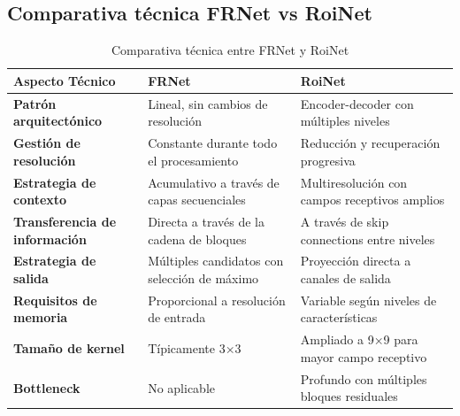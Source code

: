 \documentclass[11pt,a4paper]{report} %
\begin{document}
\subsection{Comparativa técnica FRNet vs RoiNet}
\begin{table}[htbp]
\centering
\caption{Comparativa técnica entre FRNet y RoiNet}
\begin{tabular}{|l|l|l|}
\hline
\textbf{Aspecto Técnico} & \textbf{FRNet} & \textbf{RoiNet} \\
\hline
\textbf{Patrón arquitectónico} & Lineal, sin cambios de resolución & Encoder-decoder con múltiples niveles \\
\hline
\textbf{Gestión de resolución} & Constante durante todo el procesamiento & Reducción y recuperación progresiva \\
\hline
\textbf{Estrategia de contexto} & Acumulativo a través de capas secuenciales & Multiresolución con campos receptivos amplios \\
\hline
\textbf{Transferencia de información} & Directa a través de la cadena de bloques & A través de skip connections entre niveles \\
\hline
\textbf{Estrategia de salida} & Múltiples candidatos con selección de máximo & Proyección directa a canales de salida \\
\hline
\textbf{Requisitos de memoria} & Proporcional a resolución de entrada & Variable según niveles de características \\
\hline
\textbf{Tamaño de kernel} & Típicamente 3×3 & Ampliado a 9×9 para mayor campo receptivo \\
\hline
\textbf{Bottleneck} & No aplicable & Profundo con múltiples bloques residuales \\
\hline
\end{tabular}
\label{tab:frnet_roinet_compare}
\end{table}
\end{document}
